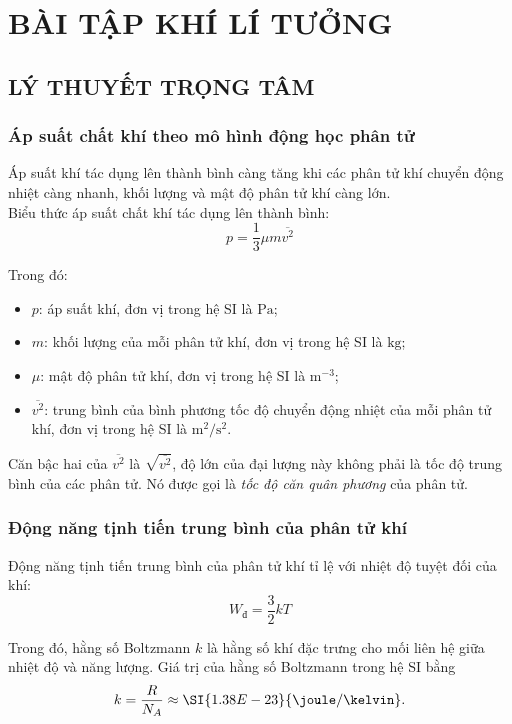 \section{BÀI TẬP KHÍ LÍ TƯỞNG}
\subsection{LÝ THUYẾT TRỌNG TÂM}
\subsubsection{Áp suất chất khí theo mô hình động học phân tử}
\begin{boxdl}
	Áp suất khí tác dụng lên thành bình càng tăng khi các phân tử khí chuyển động nhiệt càng nhanh, khối lượng và mật độ phân tử khí càng lớn.\\
	Biểu thức áp suất chất khí tác dụng lên thành bình:
	\begin{equation}
		p=\dfrac{1}{3}\mu m\overline{v^2}
	\end{equation}
\end{boxdl}
Trong đó:
\begin{itemize}
	\item $p$: áp suất khí, đơn vị trong hệ SI là $\si{\pascal}$;
	\item $m$: khối lượng của mỗi phân tử khí, đơn vị trong hệ SI là $\si{\kilogram}$;
	\item $\mu$: mật độ phân tử khí, đơn vị trong hệ SI là $\si{\meter^{-3}}$;
	\item $\overline{v^2}$: trung bình của bình phương tốc độ chuyển động nhiệt của mỗi phân tử khí, đơn vị trong hệ SI là $\si{\meter^2/\second^2}$.
\end{itemize}
\begin{luuy}
	Căn bậc hai của $\overline{v^2}$ là $\sqrt{\overline{v^2}}$, độ lớn của đại lượng này không phải là tốc độ trung bình của các phân tử. Nó được gọi là \textit{tốc độ căn quân phương} của phân tử.
\end{luuy}
\subsubsection{Động năng tịnh tiến trung bình của phân tử khí}
\begin{boxdl}
	Động năng tịnh tiến trung bình của phân tử khí tỉ lệ với nhiệt độ tuyệt đối của khí:
	\begin{equation}
		W_\text{đ}=\dfrac{3}{2}kT
	\end{equation}
	
\end{boxdl}
\begin{boxdn}
	Trong đó, hằng số Boltzmann $k$ là hằng số khí đặc trưng cho mối liên hệ giữa nhiệt độ và năng lượng. Giá trị của hằng số Boltzmann trong hệ SI bằng
	$$k=\dfrac{R}{N_A}\approx\SI{1.38E-23}{\joule/\kelvin}.$$
\end{boxdn}

